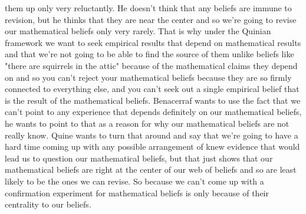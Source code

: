\documentclass[12pt]{article}
\theoremstyle{definition}
\begin{document}
\begin{enumerate}
        them up only very reluctantly. He doesn't think that any beliefs are
        immune to revision, but he thinks that they are near the center and so
        we're going to revise our mathematical beliefs only very rarely. That
        is why under the Quinian framework we want to seek empirical results
        that depend on mathematical results and that we're not going to be able
        to find the source of them unlike beliefs like "there are squirrels in
        the attic" because of the mathematical claims they depend on and so you
        can't reject your mathematical beliefs because they are so firmly
        connected to everything else, and you can't seek out a single empirical
        belief that is the result of the mathematical beliefs. Benacerraf wants
        to use the fact that we can't point to any experience that depends
        definitely on our mathematical beliefs, he wants to point to that as a
        reason for why our mathematical beliefs are not really know. Quine
        wants to turn that around and say that we're going to have a hard time
        coming up with any possible arrangement of knew evidence that would
        lead us to question our mathematical beliefs, but that just shows that
        our mathematical beliefs are right at the center of our web of beliefs
        and so are least likely to be the ones we can revise. So because we
        can't come up with a confirmation experiment for mathematical beliefs
        is only because of their centrality to our beliefs.
\end{enumerate}
\end{document}
